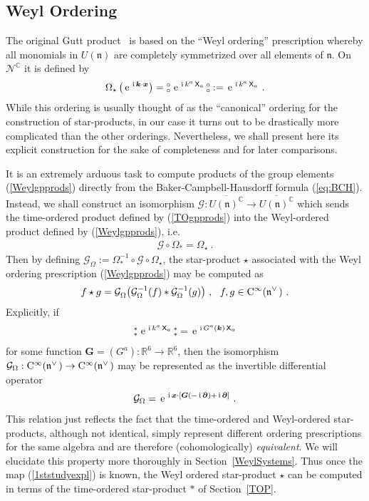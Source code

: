\documentclass[11pt,a4paper]{article}
\newcommand{\NO}{\mbox{$\substack{\circ\\\circ}$}}      %
\newcommand{\NOa}{\mbox{$\substack{\ast\\\ast}$}}       %
\newcommand{\1}{\mathbb{1}}
\newcommand{\mbf}[1]{{\boldsymbol {#1} }}
\def\ii{{\,{\rm i}\,}}
\def\CC{{\rm C}}
\def\X{{\sf X}}
\def\mx{{\mbf x}}
\def\mk{{\mbf k}}
\def\mG{{\mbf G}}
\def\mfn{{\mathfrak n}}
\newcommand{\complex}{{\mathbb C}} %
\newcommand{\real}{{\mathbb R}} %
\def\e{{\,\rm e}\,}
\newcommand{\beq}{\begin{eqnarray}}
\newcommand{\eeq}{\end{eqnarray}}
\begin{document}
\subsection{Weyl Ordering\label{WOP}}

The original Gutt product~\cite{Gutt1} is based on the ``Weyl
ordering'' prescription whereby all monomials  in $U(\mfn)$ are
completely symmetrized over all elements of $\mfn$. On
$\mathcal{N}^\complex$ it is defined by
\beq
\Omega_\star\left(\e^{\ii\mk\cdot\mx}\right)=
\NO\,\e^{\ii k^a\,\X_a}\,\NO:=\e^{\ii k^a\,\X_a} \ .
\label{Weylgpprods}\eeq
While this ordering is usually thought of as the ``canonical''
ordering for the construction of star-products, in our case it turns
out to be drastically more complicated than the other
orderings. Nevertheless, we shall present here its explicit
construction for the sake of completeness and for later comparisons.

It is an extremely arduous task to compute products of the group
elements (\ref{Weylgpprods}) directly from the
Baker-Campbell-Hausdorff formula (\ref{eq:BCH}). Instead, we shall
construct an isomorphism $\mathcal{G}:\overline{U(\mfn)^\complex}\to
\overline{U(\mfn)^\complex}$ which sends the time-ordered product defined by
(\ref{TOgpprods}) into the Weyl-ordered product defined by
(\ref{Weylgpprods}), i.e.
\beq
\mathcal{G}\circ\Omega_*=\Omega_\star \ .
\label{1ststudy}\eeq
Then by defining
$\mathcal{G}_\Omega:=\Omega_*^{-1}\circ\mathcal{G}\circ\Omega^{~}_\star$,
the star-product $\star$ associated with the Weyl ordering
prescription (\ref{Weylgpprods}) may be computed as
\beq
f\star g=\mathcal{G}^{~}_\Omega\bigl(\mathcal{G}_\Omega^{-1}(f)*
\mathcal{G}_\Omega^{-1}(g)\bigr) \ , ~~ f,g\in\CC^\infty(\mfn^{\vee\,}) \ .
\label{WeylTOrel}\eeq
Explicitly, if
\beq
\NOa\,\e^{\ii k^a\,\X_a}\,\NOa=\e^{\ii G^a(\mk)\,\X_a}
\label{1ststudyexpl}\eeq
for some function $\mG=(G^a):\real^6\to\real^6$, then the isomorphism
$\mathcal{G}_\Omega:\CC^\infty(\mfn^{\vee\,})\to\CC^\infty(\mfn^{\vee\,})$ may
be represented as the invertible differential operator
\beq
\mathcal{G}_\Omega=\e^{\ii\mx\cdot[\mG(-\ii\mbf\partial)+\ii\mbf
\partial]} \ .
\label{Gdiffop}\eeq
This relation just reflects the fact that the time-ordered and
Weyl-ordered star-products, although not identical, simply represent
different ordering prescriptions for the same algebra and are
therefore (cohomologically) {\it
  equivalent}. We will elucidate this property more thoroughly in
Section~\ref{WeylSystems}. Thus once the map (\ref{1ststudyexpl}) is
known, the Weyl ordered star-product $\star$ can be computed in terms
of the time-ordered star-product $*$ of Section~\ref{TOP}.
\end{document}
